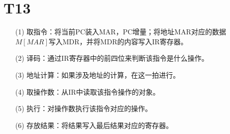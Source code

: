 \documentclass{article}
\begin{document}
\section*{T13}
\begin{enumerate}
    \item [(1)] 取指令：将当前PC装入MAR，PC增量；将地址MAR对应的数据$M[MAR]$写入MDR，并将MDR的内容写入IR寄存器。
    
    \item [(2)] 译码：通过IR寄存器中的前四位来判断该指令是什么操作。
        
    \item [(3)] 地址计算：如果涉及地址的计算，在这一拍进行。

    \item [(4)] 取操作数：从IR中读取该指令操作的对象。
    
    \item [(5)] 执行：对操作数执行该指令对应的操作。
    
    \item [(6)] 存放结果：将结果写入最后结果对应的寄存器。
\end{enumerate}
\end{document}
